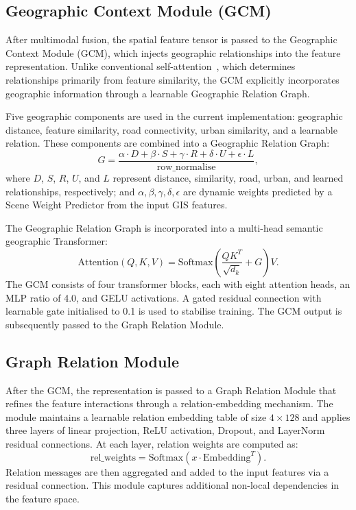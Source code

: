 \documentclass[sigconf, review=true]{acmart}
\begin{document}
\subsection{Geographic Context Module (GCM)}

After multimodal fusion, the spatial feature tensor is passed to the Geographic Context Module (GCM), which injects geographic relationships into the feature representation. Unlike conventional self-attention~\cite{vaswani2017attention}, which determines relationships primarily from feature similarity, the GCM explicitly incorporates geographic information through a learnable Geographic Relation Graph.

Five geographic components are used in the current implementation: geographic distance, feature similarity, road connectivity, urban similarity, and a learnable relation. These components are combined into a Geographic Relation Graph:
\begin{equation}
  G = \frac{\alpha \cdot D + \beta \cdot S + \gamma \cdot R + \delta \cdot U + \epsilon \cdot L}{\text{row\_normalise}},
  \label{eq:grg}
\end{equation}
where $D$, $S$, $R$, $U$, and $L$ represent distance, similarity, road, urban, and learned relationships, respectively; and $\alpha, \beta, \gamma, \delta, \epsilon$ are dynamic weights predicted by a Scene Weight Predictor from the input GIS features.

The Geographic Relation Graph is incorporated into a multi-head semantic geographic Transformer:
\begin{equation}
  \mathrm{Attention}(Q,K,V) = \mathrm{Softmax}\!\left(\frac{QK^{T}}{\sqrt{d_k}} + G\right)V.
  \label{eq:gcm-attention}
\end{equation}
The GCM consists of four transformer blocks, each with eight attention heads, an MLP ratio of 4.0, and GELU activations. A gated residual connection with learnable gate initialised to 0.1 is used to stabilise training. The GCM output is subsequently passed to the Graph Relation Module.

\subsection{Graph Relation Module}

After the GCM, the representation is passed to a Graph Relation Module that refines the feature interactions through a relation-embedding mechanism. The module maintains a learnable relation embedding table of size $4\times128$ and applies three layers of linear projection, ReLU activation, Dropout, and LayerNorm residual connections. At each layer, relation weights are computed as:
\begin{equation}
  \text{rel\_weights} = \mathrm{Softmax}(x \cdot \mathrm{Embedding}^T).
\end{equation}
Relation messages are then aggregated and added to the input features via a residual connection. This module captures additional non-local dependencies in the feature space.
\end{document}
